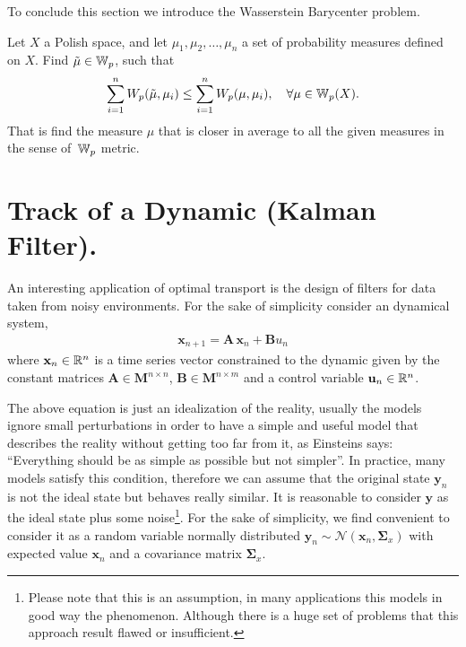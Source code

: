 To conclude this section we  introduce the Wasserstein Barycenter problem.
\begin{problem}
	Let $X$ a Polish space, and let $\mu_1, \mu_2, \dots, \mu_n$ a set of probability measures defined on $X$. Find $\tilde{\mu}\in \mathbb{W}_{p}$, such that
	\begin{equation}
		\sum_{i=1}^{n}W_{p}(\tilde{\mu}, \mu_i)\leq \sum_{i=1}^{n}W_{p}(\mu,\mu_i),\quad \forall \mu \in \mathbb{W}_{p}(X).
	\end{equation}
	That is find the measure $\mu$ that is closer in average to all the given measures in the sense of  $\,\mathbb{W}_{p}$ metric.
\end{problem}

\section{Track of a Dynamic (Kalman Filter).}
An interesting application of optimal transport is the design of filters for data taken from noisy environments.	
For the sake of simplicity consider an dynamical system,
\begin{align}
\mathbf{x}_{n+1}=\mathbf{A}\,\mathbf{x}_{n}+\mathbf{B}u_n
\end{align}
where $\mathbf{x}_n\in\mathbb{R}^n$ is a time series vector constrained to the dynamic given by the constant matrices $\mathbf{A}\in\mathbf{M}^{n\times n}$, $\mathbf{B}\in \mathbf{M}^{n\times m}$ and a control variable $\mathbf{u}_n\in\mathbb{R}^n$. 

The above equation is just an idealization of the reality, usually the models ignore small perturbations in order to have a simple and useful model that describes the reality without getting too far from it, as Einsteins says: ``Everything should be as simple as possible but not simpler''. In practice, many models satisfy this condition, therefore we can assume that the original state $\mathbf{y}_n$ is not the ideal state but behaves really similar. It is reasonable to consider $\mathbf{y}$ as the ideal state plus some noise\footnote{Please note that this is an assumption, in many applications this models in good way the phenomenon. Although there is a huge set of problems that this approach result flawed or insufficient.}. For the sake of simplicity, we find convenient to consider it as a random variable normally distributed $\mathbf{y}_n\sim\mathcal{N}(\mathbf{x}_n,\pmb{\Sigma}_x)$ with expected value $\mathbf{x}_n$ and a covariance matrix $\pmb{\Sigma}_x$.

